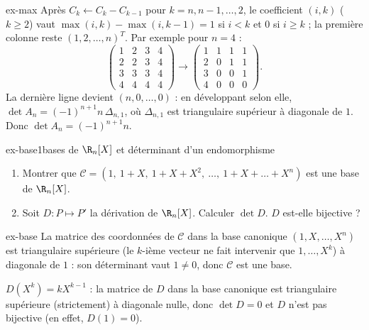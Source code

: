 \begin{corrige}{ex-max}
Après $C_k\leftarrow C_k-C_{k-1}$ pour $k=n,n-1,\dots,2$, le coefficient $(i,k)$ ($k\geq2$) vaut
$\max(i,k)-\max(i,k-1)=1$ si $i<k$ et $0$ si $i\geq k$ ; la première colonne reste $(1,2,\dots,n)^T$. Par exemple pour $n=4$ :
\[\begin{pmatrix}1&2&3&4\\2&2&3&4\\3&3&3&4\\4&4&4&4\end{pmatrix}\longrightarrow\begin{pmatrix}1&1&1&1\\2&0&1&1\\3&0&0&1\\4&0&0&0\end{pmatrix}.\]
La dernière ligne devient $(n,0,\dots,0)$ : en développant selon elle, $\det A_n=(-1)^{n+1}n\,\Delta_{n,1}$, où $\Delta_{n,1}$ est triangulaire supérieur à diagonale de $1$. Donc $\det A_n=(-1)^{n+1}n$.
\end{corrige}

\begin{exo}{ex-base}{1}{bases de $\R_n[X]$ et déterminant d'un endomorphisme}
\begin{enumerate}
\item Montrer que $\mathcal C=(1,\ 1+X,\ 1+X+X^2,\ \dots,\ 1+X+\dots+X^n)$ est une base de $\R_n[X]$.
\item Soit $D:P\mapsto P'$ la dérivation de $\R_n[X]$. Calculer $\det D$. $D$ est-elle bijective ?
\end{enumerate}
\end{exo}

\begin{corrige}{ex-base}
 La matrice des coordonnées de $\mathcal C$ dans la base canonique $(1,X,\dots,X^n)$ est triangulaire supérieure (le $k$-ième vecteur ne fait intervenir que $1,\dots,X^k$) à diagonale de $1$ : son déterminant vaut $1\neq0$, donc $\mathcal C$ est une base.

 $D(X^k)=kX^{k-1}$ : la matrice de $D$ dans la base canonique est triangulaire supérieure (strictement) à diagonale nulle, donc $\det D=0$ et $D$ n'est pas bijective (en effet, $D(1)=0$).
\end{corrige}

